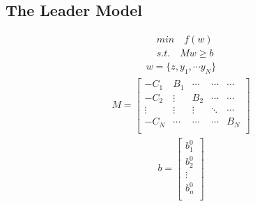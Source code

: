 \documentclass[11pt]{article} %
\begin{document}
\subsection{The Leader Model}
\begin{align}  
    &min \quad f(w)\nonumber\\
    &s.t. \quad Mw \geq b
\end{align}
\begin{align}  
    w = \{z, y_{1}, \cdots y_{N}\}
\end{align}
\begin{align}  
    M = \begin{bmatrix}
        -C_{1} & B_{1} & \cdots & \cdots & \cdots\\
        -C_{2} &\vdots  & B_{2} & \cdots & \cdots\\
         \vdots  & \vdots  & \vdots & \ddots  & \cdots\\
        -C_{N} & \cdots  & \cdots & \cdots & B_{N}\\
    \end{bmatrix}
\end{align}
\begin{align}  
    b = \begin{bmatrix}
        b_{1}^0\\
        b_{2}^0\\
        \vdots \\
        b_{n}^0\\
    \end{bmatrix}
\end{align}
\end{document}
